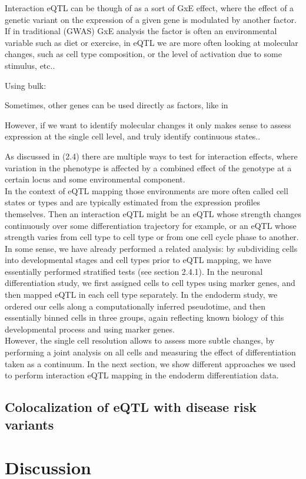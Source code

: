 Interaction eQTL can be though of as a sort of GxE effect, where the effect of a genetic variant on the expression of a given gene is modulated by another factor.
If in traditional (GWAS) GxE analysis the factor is often an environmental variable such as diet or exercise, in eQTL we are more often looking at molecular changes, such as cell type composition, or the level of activation due to some stimulus, etc..

Using bulk:

Sometimes, other genes can be used directly as factors, like in \cite{zhernakova2017identification}

However, if we want to identify molecular changes it only makes sense to assess expression at the single cell level, and truly identify continuous states..


As discussed in (2.4) there are multiple ways to test for interaction effects, where variation in the phenotype is affected by a combined effect of the genotype at a certain locus and some environmental component.\\

In the context of eQTL mapping those environments are more often called cell states or types and are typically estimated from the expression profiles themselves. 
Then an interaction eQTL might be an eQTL whose strength changes continuously over some differentiation trajectory for example, or an eQTL whose strength varies from cell type to cell type or from one cell cycle phase to another.\\ 

In some sense, we have already performed a related analysis: by subdividing cells into developmental stages and cell types prior to eQTL mapping, we have essentially performed stratified tests (see section 2.4.1).
In the neuronal differentiation study, we first assigned cells to cell types using marker genes, and then mapped eQTL in each cell type separately.
In the endoderm study, we ordered our cells along a computationally inferred pseudotime, and then essentially binned cells in three groups, again reflecting known biology of this developmental process and using marker genes.\\

However, the single cell resolution allows to assess more subtle changes, by performing a joint analysis on all cells and measuring the effect of differentiation taken as a continuum.
In the next section, we show different approaches we used to perform interaction eQTL mapping in the endoderm differentiation data.

\subsection{Colocalization of eQTL with disease risk variants}

\section{Discussion}